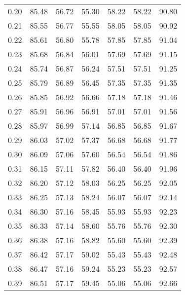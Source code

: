 \begin{tabular}{|c|c|c|c|c|c|c|}
      0.20 &     85.48 &     56.72 &      55.30 &   58.22 &      58.22 &         90.80 \\
      0.21 &     85.55 &     56.77 &      55.55 &   58.05 &      58.05 &         90.92 \\
      0.22 &     85.61 &     56.80 &      55.78 &   57.85 &      57.85 &         91.04 \\
      0.23 &     85.68 &     56.84 &      56.01 &   57.69 &      57.69 &         91.15 \\
      0.24 &     85.74 &     56.87 &      56.24 &   57.51 &      57.51 &         91.25 \\
      0.25 &     85.79 &     56.89 &      56.45 &   57.35 &      57.35 &         91.35 \\
      0.26 &     85.85 &     56.92 &      56.66 &   57.18 &      57.18 &         91.46 \\
      0.27 &     85.91 &     56.96 &      56.91 &   57.01 &      57.01 &         91.56 \\
      0.28 &     85.97 &     56.99 &      57.14 &   56.85 &      56.85 &         91.67 \\
      0.29 &     86.03 &     57.02 &      57.37 &   56.68 &      56.68 &         91.77 \\
      0.30 &     86.09 &     57.06 &      57.60 &   56.54 &      56.54 &         91.86 \\
      0.31 &     86.15 &     57.11 &      57.82 &   56.40 &      56.40 &         91.96 \\
      0.32 &     86.20 &     57.12 &      58.03 &   56.25 &      56.25 &         92.05 \\
      0.33 &     86.25 &     57.13 &      58.24 &   56.07 &      56.07 &         92.14 \\
      0.34 &     86.30 &     57.16 &      58.45 &   55.93 &      55.93 &         92.23 \\
      0.35 &     86.33 &     57.14 &      58.60 &   55.76 &      55.76 &         92.30 \\
      0.36 &     86.38 &     57.16 &      58.82 &   55.60 &      55.60 &         92.39 \\
      0.37 &     86.42 &     57.17 &      59.02 &   55.43 &      55.43 &         92.48 \\
      0.38 &     86.47 &     57.16 &      59.24 &   55.23 &      55.23 &         92.57 \\
      0.39 &     86.51 &     57.17 &      59.45 &   55.06 &      55.06 &         92.66 \\

\end{tabular}
